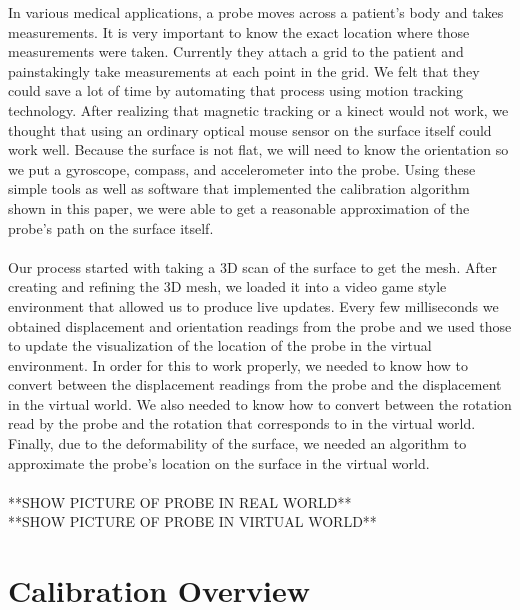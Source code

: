 \documentclass[11pt,psfig]{article}
\begin{document}
In various medical applications, a probe moves across a patient's body and takes measurements. It is very important to know the exact location where those measurements were taken. Currently they attach a grid to the patient and painstakingly take measurements at each point in the grid. We felt that they could save a lot of time by automating that process using motion tracking technology. After realizing that magnetic tracking or a kinect would not work, we thought that using an ordinary optical mouse sensor on the surface itself could work well. Because the surface is not flat, we will need to know the orientation so we put a gyroscope, compass, and accelerometer into the probe. Using these simple tools as well as software that implemented the calibration algorithm shown in this paper, we were able to get a reasonable approximation of the probe's path on the surface itself.\\
\\
Our process started with taking a 3D scan of the surface to get the mesh. After creating and refining the 3D mesh, we loaded it into a video game style environment that allowed us to produce live updates. Every few milliseconds we obtained displacement and orientation readings from the probe and we used those to update the visualization of the location of the probe in the virtual environment. In order for this to work properly, we needed to know how to convert between the displacement readings from the probe and the displacement in the virtual world. We also needed to know how to convert between the rotation read by the probe and the rotation that corresponds to in the virtual world. Finally, due to the deformability of the surface, we needed an algorithm to approximate the probe's location on the surface in the virtual world.\\
\\
**SHOW PICTURE OF PROBE IN REAL WORLD**\\
**SHOW PICTURE OF PROBE IN VIRTUAL WORLD**

\section*{Calibration Overview}
\end{document}
